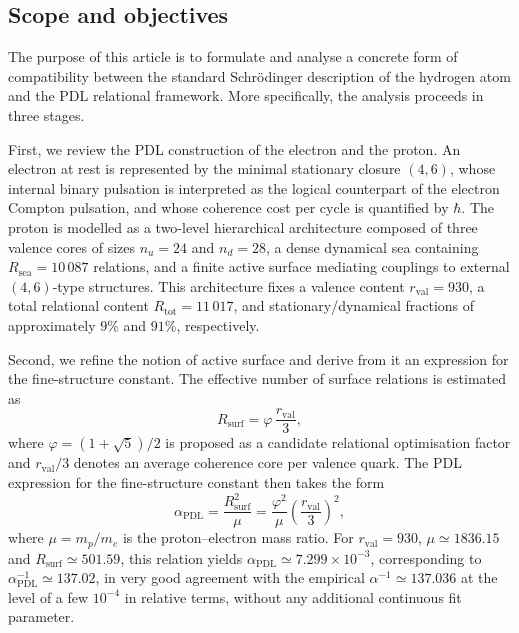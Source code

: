 \documentclass[12pt,a4paper]{article}
\begin{document}
\subsection{Scope and objectives}

The purpose of this article is to formulate and analyse a concrete form of compatibility between the standard Schr\"odinger description of the hydrogen atom and the PDL relational framework. More specifically, the analysis proceeds in three stages.

First, we review the PDL construction of the electron and the proton. An electron at rest is represented by the minimal stationary closure \((4,6)\), whose internal binary pulsation is interpreted as the logical counterpart of the electron Compton pulsation, and whose coherence cost per cycle is quantified by \(\hbar\). The proton is modelled as a two-level hierarchical architecture composed of three valence cores of sizes \(n_u = 24\) and \(n_d = 28\), a dense dynamical sea containing \(R_{\text{sea}} = 10\,087\) relations, and a finite active surface mediating couplings to external \((4,6)\)-type structures. This architecture fixes a valence content \(r_{\text{val}} = 930\), a total relational content \(R_{\text{tot}} = 11\,017\), and stationary/dynamical fractions of approximately \(9\%\) and \(91\%\), respectively.\cite{Laubscher2026PDL_English,Laubscher2026LDP_French}

Second, we refine the notion of active surface and derive from it an expression for the fine-structure constant. The effective number of surface relations is estimated as
\[
  R_{\text{surf}} = \varphi\,\frac{r_{\text{val}}}{3},
\]
where \(\varphi = (1+\sqrt{5})/2\) is proposed as a candidate relational optimisation factor and \(r_{\text{val}}/3\) denotes an average coherence core per valence quark. The PDL expression for the fine-structure constant then takes the form
\[
\alpha_{\text{PDL}}
  = \frac{R_{\text{surf}}^2}{\mu}
  = \frac{\varphi^2}{\mu}\left(\frac{r_{\text{val}}}{3}\right)^2,
\]
where \(\mu = m_p/m_e\) is the proton–electron mass ratio. For \(r_{\text{val}} = 930\), \(\mu \simeq 1836.15\) and \(R_{\text{surf}} \simeq 501.59\), this relation yields \(\alpha_{\text{PDL}} \simeq 7.299 \times 10^{-3}\), corresponding to \(\alpha_{\text{PDL}}^{-1} \simeq 137.02\), in very good agreement with the empirical \(\alpha^{-1} \simeq 137.036\) at the level of a few \(10^{-4}\) in relative terms, without any additional continuous fit parameter.
\cite{Laubscher2026PDL_English,Laubscher2026LDP_French}
\end{document}

